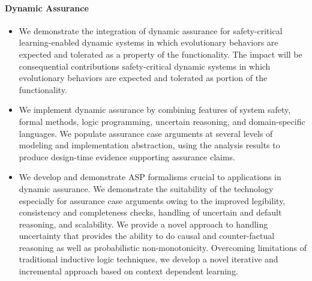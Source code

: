 \documentclass[12pt]{dod-blank}
\begin{document}
\paragraph{Dynamic Assurance}

\begin{itemize}[itemsep=0pt,leftmargin=*]

\item We demonstrate the integration of dynamic assurance for safety-critical learning-enabled dynamic systems in which evolutionary behaviors are expected and tolerated as a property of the functionality.   The impact will be consequential contributions safety-critical dynamic systems in which evolutionary behaviors are expected and tolerated as portion of the functionality.   
\item We implement dynamic assurance by combining features of system safety, formal methods, logic programming, uncertain reasoning, and domain-specific languages.  We populate assurance case arguments at several levels of modeling and implementation abstraction, using the analysis results to produce design-time evidence supporting assurance claims.  
\item We develop and demonstrate ASP formalisms crucial to applications in dynamic assurance. We demonstrate the suitability of the technology especially for assurance case arguments owing to the improved legibility, consistency and completeness checks, handling of uncertain and default reasoning, and scalability.  
We provide a novel approach to handling uncertainty that provides the ability to do causal and counter-factual reasoning as well as probabilistic non-monotonicity.  Overcoming limitations of traditional inductive logic techniques, we develop a novel iterative and incremental approach based on context dependent learning. 
\end{itemize}
\end{document}
